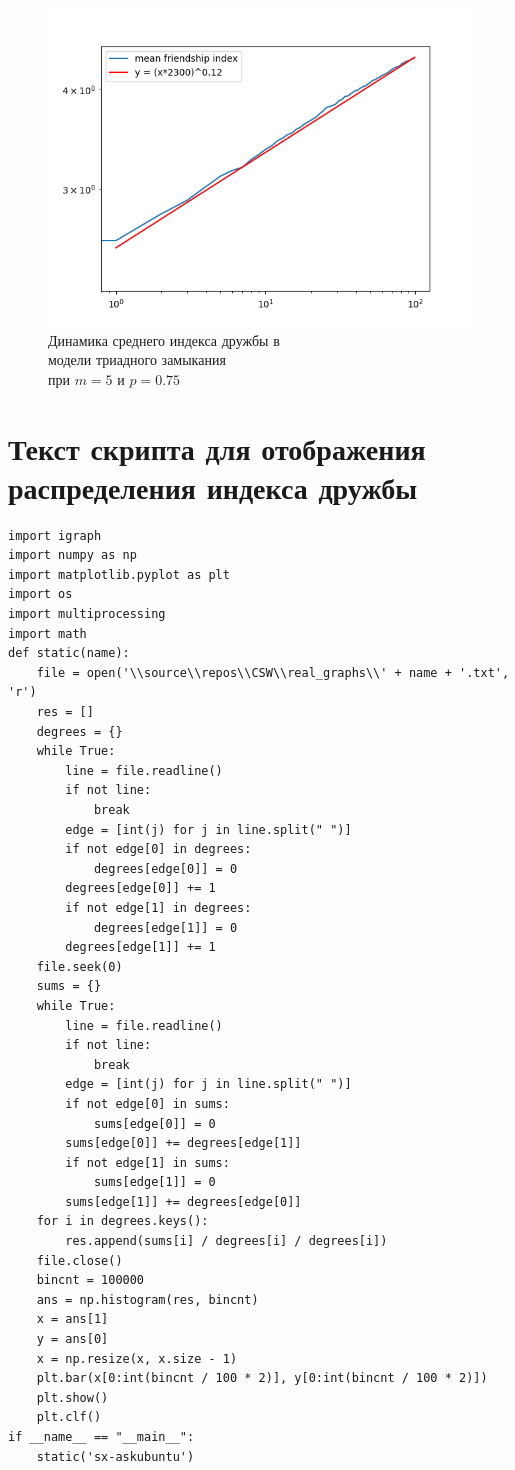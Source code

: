 \documentclass[bachelor, och, diploma]{SCWorks}
\begin{document}
\begin{figure}[!ht]
    \centering
    \includegraphics[scale=0.7]{diploma_results/dynamic_log/triad_mean_beta_5_0.75.png}
    \caption{Динамика среднего индекса дружбы  в\\ модели триадного замыкания\\ при $m=5$ и $p=0.75$}
\end{figure}
\section{Текст скрипта для отображения распределения индекса дружбы}\label{app:rgs}
\begin{verbatim}
import igraph
import numpy as np
import matplotlib.pyplot as plt
import os
import multiprocessing 
import math
def static(name):
    file = open('\\source\\repos\\CSW\\real_graphs\\' + name + '.txt', 'r')
    res = []
    degrees = {}
    while True:
        line = file.readline()
        if not line:
            break
        edge = [int(j) for j in line.split(" ")]
        if not edge[0] in degrees:
            degrees[edge[0]] = 0
        degrees[edge[0]] += 1
        if not edge[1] in degrees:
            degrees[edge[1]] = 0
        degrees[edge[1]] += 1
    file.seek(0)
    sums = {}
    while True:
        line = file.readline()
        if not line:
            break
        edge = [int(j) for j in line.split(" ")]
        if not edge[0] in sums:
            sums[edge[0]] = 0
        sums[edge[0]] += degrees[edge[1]]
        if not edge[1] in sums:
            sums[edge[1]] = 0
        sums[edge[1]] += degrees[edge[0]]
    for i in degrees.keys():
        res.append(sums[i] / degrees[i] / degrees[i])
    file.close()
    bincnt = 100000
    ans = np.histogram(res, bincnt)
    x = ans[1]
    y = ans[0]
    x = np.resize(x, x.size - 1)
    plt.bar(x[0:int(bincnt / 100 * 2)], y[0:int(bincnt / 100 * 2)])
    plt.show()
    plt.clf()
if __name__ == "__main__":
    static('sx-askubuntu')
\end{verbatim}
\end{document}
